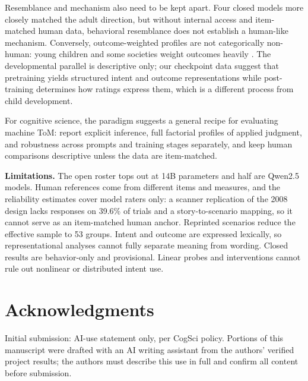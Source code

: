 \documentclass[10pt,letterpaper]{article}
\begin{document}
Resemblance and mechanism also need to be kept apart.
Four closed models more closely matched the adult direction, but without internal access and item-matched human data, behavioral resemblance does not establish a human-like mechanism.
Conversely, outcome-weighted profiles are not categorically non-human: young children and some societies weight outcomes heavily \citep{cushman2013development,barrett2016societies}.
The developmental parallel is descriptive only; our checkpoint data suggest that pretraining yields structured intent and outcome representations while post-training determines how ratings express them, which is a different process from child development.

For cognitive science, the paradigm suggests a general recipe for evaluating machine ToM: report explicit inference, full factorial profiles of applied judgment, and robustness across prompts and training stages separately, and keep human comparisons descriptive unless the data are item-matched.

\textbf{Limitations.}
The open roster tops out at 14B parameters and half are Qwen2.5 models.
Human references come from different items and measures, and the reliability estimates cover model raters only: a scanner replication of the 2008 design lacks responses on 39.6\% of trials and a story-to-scenario mapping, so it cannot serve as an item-matched human anchor.
Reprinted scenarios reduce the effective sample to 53 groups.
Intent and outcome are expressed lexically, so representational analyses cannot fully separate meaning from wording.
Closed results are behavior-only and provisional.
Linear probes and interventions cannot rule out nonlinear or distributed intent use.

\section{Acknowledgments}
Initial submission: AI-use statement only, per CogSci policy.
Portions of this manuscript were drafted with an AI writing assistant from the authors' verified project results; the authors must describe this use in full and confirm all content before submission.

\printbibliography
\end{document}
